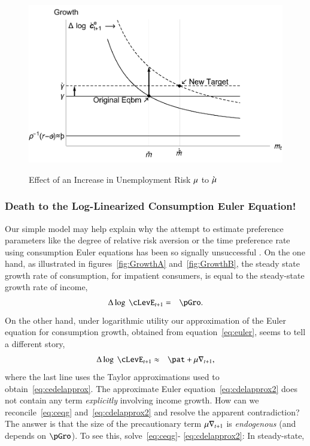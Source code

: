 \documentclass[titlepage,abstract]{\econtex}\newcommand{\texname}{ctDiscrete}
\begin{document}
\begin{figure}
\caption{Effect of an Increase in Unemployment Risk $\mu$ to $\grave{\mu}$}
\includegraphics{./Figures/cGroIncreaseMhoPlot}
\label{fig:cGroIncreaseMhoPlot}
\end{figure}


\subsubsection{Death to the Log-Linearized Consumption Euler Equation!\label{sec:death}}
Our simple model may help explain why the attempt to estimate preference
parameters like the degree of relative risk aversion or the time
preference rate using consumption Euler equations has been so signally
unsuccessful \citep{carroll:death}. On the one hand, as illustrated
in figures~\ref{fig:GrowthA} and~\ref{fig:GrowthB}, the steady state
growth rate of consumption, for impatient consumers, is equal to the
steady-state growth rate of income,
\begin{eqnarray}
        \Delta \log ~ \cLevE_{t+1} & = & \pGro. \label{eq:ceqg}
\end{eqnarray}
On the other hand, under logarithmic utility our approximation of the Euler equation for consumption growth, obtained from equation~\eqref{eq:euler}, seems to tell a different story,
\begin{eqnarray}
         \Delta \log ~\cLevE_{t+1} & \approx & \pat +  \urate \nabla _{t+1}, \label{eq:cdelapprox2}
\end{eqnarray}
where the last line uses the Taylor approximations used to obtain~\eqref{eq:cedelapprox}.
The approximate Euler equation~\eqref{eq:cdelapprox2} does not contain any term \textit{explicitly} involving income growth. How can we reconcile~\eqref{eq:ceqg} and~\eqref{eq:cdelapprox2} and resolve the apparent contradiction? The answer is that the size of the precautionary term $\mu \nabla_{t+1}$
is \textit{endogenous} (and depends on $\pGro$). To see this, solve~\eqref{eq:ceqg}-
\eqref{eq:cdelapprox2}: In steady-state,
\end{document}
